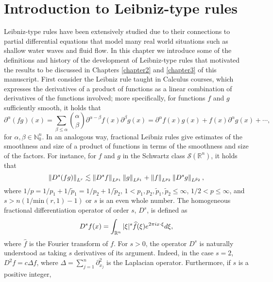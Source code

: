 
\cleardoublepage


\chapter{Introduction to Leibniz-type rules}
\label{makereference1}

Leibniz-type rules have been extensively studied due to their connections to partial differential equations that model many real world situations such as shallow water waves and fluid flow. In this chapter we introduce some of the definitions and history of the development of Leibniz-type rules that motivated the results to be discussed in Chapters \ref{chapter2} and \ref{chapter3} of this manuscript. First consider the Leibniz rule taught in Calculus courses, which expresses the derivatives of a product of functions as a linear combination of derivatives of the functions involved; more specifically, for functions $f$ and $g$ sufficiently smooth, it holds that
\[\partial^\alpha (fg)(x) = \sum_{\beta \leq \alpha} \binom{\alpha}{\beta} \partial^{\alpha - \beta} f(x) \partial^{\beta} g(x) = \partial^\alpha f(x) g(x) + f(x) \partial^\alpha g(x) + \cdots ,\]
for $\alpha,\beta \in \mathbb{N}^n_0$.
In an analogous way, fractional Leibniz rules give estimates of the smoothness and size of a product of functions in terms of the smoothness and size of the factors. For instance, for $f$ and $g$ in the Schwartz class $\mathcal{S}(\mathbb{R}^n)$, it holds that
\begin{equation}\label{def:leibniz}
\left\|D^s (fg)\right\|_{L^r} \lesssim \left\|D^s f\right\|_{L^{p_1}}\left\|g\right\|_{L^{\tilde{p}_1}} + \left\|f\right\|_{L^{p_2}}\left\|D^s g\right\|_{L^{\tilde{p}_2}},
\end{equation}
where $1/p = 1/p_1 + 1/\tilde{p}_1 = 1/p_2 + 1/\tilde{p}_2$, $1<p_1,p_2,\tilde{p}_1,\tilde{p}_2\leq \infty$, $1/2 <p\leq \infty$, and $s>n(1/\text{min}(r,1) - 1)$ or $s$ is an even whole number. The homogeneous fractional differentiation operator of order $s$, $D^s$, is defined as \[D^s f(x) = \int_{{\mathbb R}^n} |\xi|^s \widehat{f}(\xi) e^{2\pi i x\cdot \xi} d\xi,\]
where $\widehat{f}$ is the Fourier transform of $f$.
For $s>0$, the operator $D^s$ is naturally understood as taking $s$ derivatives of its argument. Indeed, in the case $s=2$, $D^2f = c\Delta f$, where $\Delta = \sum_{j=1}^n \partial^2_{x_j}$ is the Laplacian operator. Furthermore, if $s$ is a positive integer,

